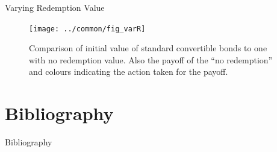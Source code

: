 \documentclass{beamer}
\begin{document}
\begin{frame}{Varying Redemption Value}
\begin{figure}[ht]
 \centering
 \texttt{[image: ../common/fig\_varR]}
 \caption[Varying Redemption Value]{Comparison of initial value of standard convertible bonds to one with no redemption value.  Also the payoff of the ``no redemption'' and colours indicating the action taken for the payoff.}
\end{figure}
\end{frame}
\section{Bibliography}

\begin{frame}{Bibliography}
\scriptsize


\end{frame}
\end{document}
